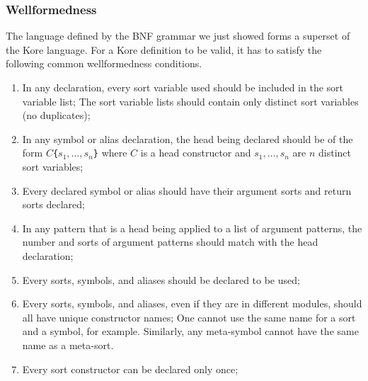 \documentclass[UTF8,11pt]{article}
\theoremstyle{plain}
\theoremstyle{definition}
\theoremstyle{remark}
\newcommand{\parametric}[2]{{#1}\raisebox{.2ex}{\texttt{\footnotesize{\{}}}#2\raisebox{.2ex}{\texttt{\footnotesize{\}}}}}
\begin{document}
%
%
%
%
%
%

\subsubsection{Wellformedness}
\label{sec:kore-syntax-wellformedness}
The language defined by the BNF grammar we just showed forms a superset of the 
Kore language.
For a Kore definition to be valid, it has to satisfy the following common 
wellformedness conditions.
\begin{enumerate}\itemsep0em
\item In any declaration, every sort variable used should be included in the
sort variable list; The sort variable lists should contain only distinct sort 
variables (no duplicates);
\item In any symbol or alias declaration, the head being declared should be of 
the form \texttt{$C$\{$s_1,\dots,s_n$\}} where $C$ is a head constructor and 
$s_1,\dots,s_n$ are $n$ distinct sort variables;
\item Every declared symbol or alias should have their argument sorts and 
return sorts declared;
\item In any pattern that is a head being applied to a list of argument 
patterns, the number and sorts of argument patterns should match with the head 
declaration;
\item Every sorts, symbols, and aliases should be declared to be used;
\item Every sorts, symbols, and aliases, even if they are in different modules, 
should all have unique constructor 
names; One cannot use the same name for a sort and a symbol, for example. 
Similarly, any meta-symbol cannot have the same name as a meta-sort.
\item Every sort constructor can be declared only once;
\end{enumerate}
\end{document}
